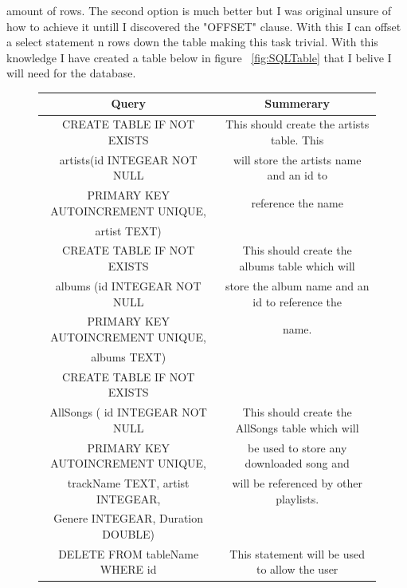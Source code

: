 \documentclass{article}
\begin{document}
amount of rows. The second option is much better but I was original unsure
of how to achieve it untill I discovered the "OFFSET" clause. With this
I can offset a select statement n rows down the table making this task
trivial.
With this knowledge I have created a table below in figure ~\ref{fig:SQLTable}
that I belive I will need for the database.
\begin{figure}[H]
    \begin{center}
        \begin{tabular} { | c | c | }
            \hline
            \textbf{Query}                   &                 \textbf{Summerary}             \\ \hline
            CREATE TABLE IF NOT EXISTS       &This should create the artists table. This      \\
            artists(id INTEGEAR NOT NULL     &will store the artists name and an id to        \\
            PRIMARY KEY AUTOINCREMENT UNIQUE,&reference the name                              \\
            artist TEXT)                     &                                                \\ \hline
            CREATE TABLE IF NOT EXISTS       &This should create the albums table which will  \\
            albums (id INTEGEAR NOT NULL     &store the album name and an id to reference the \\
            PRIMARY KEY AUTOINCREMENT UNIQUE,&name.                                           \\
            albums TEXT)                     &                                                \\ \hline
            CREATE TABLE IF NOT EXISTS       &                                                \\
            AllSongs ( id INTEGEAR NOT NULL  &This should create the AllSongs table which will\\
            PRIMARY KEY AUTOINCREMENT UNIQUE,&be used to store any downloaded song and        \\
            trackName TEXT, artist INTEGEAR, &will be referenced by other playlists.          \\
            Genere INTEGEAR, Duration DOUBLE)&                                                \\ \hline
            DELETE FROM tableName WHERE id   &This statement will be used to allow the user   \\

\end{tabular}
\end{center}
\end{figure}
\end{document}
